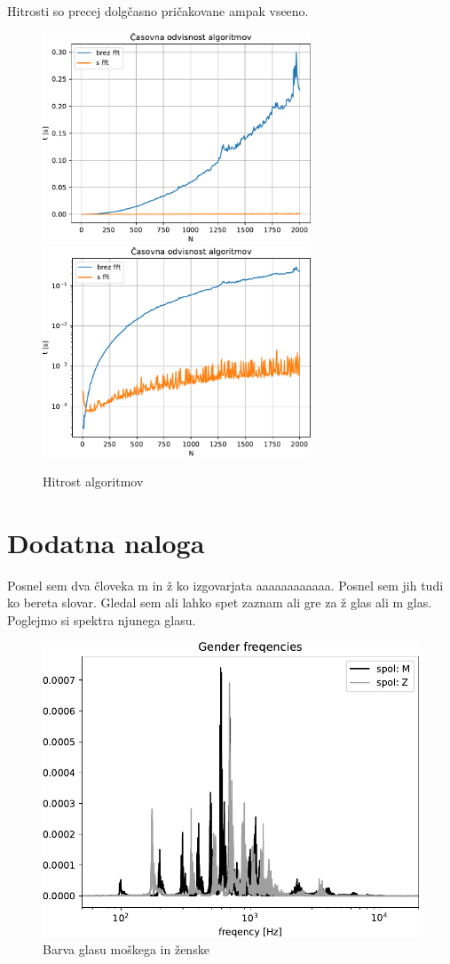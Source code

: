 Hitrosti so precej dolgčasno pričakovane ampak vseeno.
\begin{figure}[h]
    \centering
    \includegraphics[width=8cm]{pdfs/cas-lin.pdf}
    \vspace{10pt}
    \includegraphics[width=8cm]{pdfs/cas-log.pdf}
    \caption{Hitrost algoritmov}
\end{figure}
\newpage
\section{Dodatna naloga}
Posnel sem dva človeka m in ž ko izgovarjata aaaaaaaaaaaa. Posnel sem jih tudi
ko bereta slovar. Gledal sem ali lahko spet zaznam ali gre za ž glas ali m glas.
Poglejmo si spektra njunega glasu.
\begin{figure}[h]
    \begin{center}
        \includegraphics[width=12cm]{pdfs/fft_spol.pdf}
    \end{center}
    \caption{Barva glasu moškega in ženske}
\end{figure}

